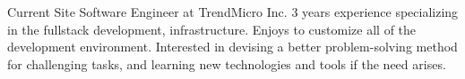 

\begin{cvparagraph}

Current Site Software Engineer at TrendMicro Inc. 3 years experience specializing in the fullstack development, infrastructure. Enjoys to customize all of the development environment. Interested in devising a better problem-solving method for challenging tasks, and learning new technologies and tools if the need arises.
\end{cvparagraph}
